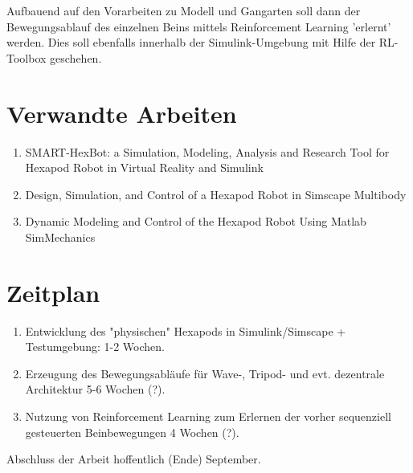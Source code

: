Aufbauend auf den Vorarbeiten zu Modell und Gangarten soll dann der Bewegungsablauf des einzelnen Beins mittels Reinforcement Learning 'erlernt' werden. Dies soll ebenfalls innerhalb der Simulink-Umgebung mit Hilfe der RL-Toolbox geschehen.





\section{Verwandte Arbeiten}
\begin{enumerate}
\item SMART-HexBot: a Simulation, Modeling, Analysis and
Research Tool for Hexapod Robot in Virtual Reality and
Simulink

\item Design, Simulation, and Control of a Hexapod Robot in
Simscape Multibody

\item Dynamic Modeling and Control of the Hexapod Robot Using Matlab SimMechanics

\end{enumerate}


\section{Zeitplan}
\begin{enumerate}
	\item Entwicklung des "physischen" Hexapods in Simulink/Simscape + Testumgebung: 1-2 Wochen.
	\item Erzeugung des Bewegungsabläufe für Wave-, Tripod- und evt. dezentrale Architektur 5-6 Wochen (?).
	\item Nutzung von Reinforcement Learning zum Erlernen der vorher sequenziell gesteuerten Beinbewegungen 4 Wochen (?).
\end{enumerate}


Abschluss der Arbeit hoffentlich (Ende) September.